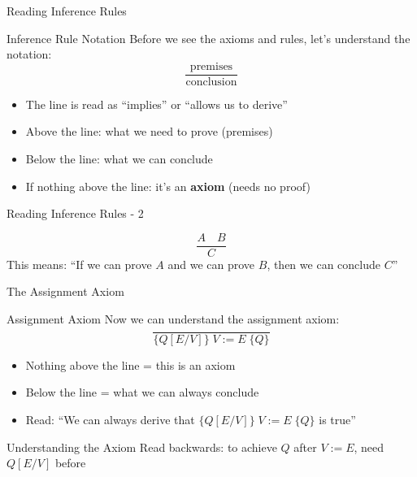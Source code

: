 \begin{frame}{Reading Inference Rules}
    \begin{block}{Inference Rule Notation}
        Before we see the axioms and rules, let's understand the notation:
        \[ \frac{\text{premises}}{\text{conclusion}} \]
        \begin{itemize}
            \item The line is read as ``implies'' or ``allows us to derive''
            \item Above the line: what we need to prove (premises)
            \item Below the line: what we can conclude
            \item If nothing above the line: it's an \textbf{axiom} (needs no proof)
        \end{itemize}
    \end{block}
    
\end{frame}

\begin{frame}{Reading Inference Rules - 2}
    \begin{example}
        \[ \frac{A \quad B}{C} \]
        This means: ``If we can prove $A$ and we can prove $B$, then we can conclude $C$''
    \end{example}
\end{frame}

\begin{frame}{The Assignment Axiom}
    \begin{block}{Assignment Axiom}
        Now we can understand the assignment axiom:
        \[ \frac{}{\{Q[E/V]\} \; V := E \; \{Q\}} \]
        \begin{itemize}
            \item Nothing above the line = this is an axiom
            \item Below the line = what we can always conclude
            \item Read: ``We can always derive that $\{Q[E/V]\} \; V := E \; \{Q\}$ is true''
        \end{itemize}
    \end{block}
    
    \begin{block}{Understanding the Axiom}
        Read backwards: to achieve $Q$ after $V := E$, need $Q[E/V]$ before
    \end{block}
\end{frame}

